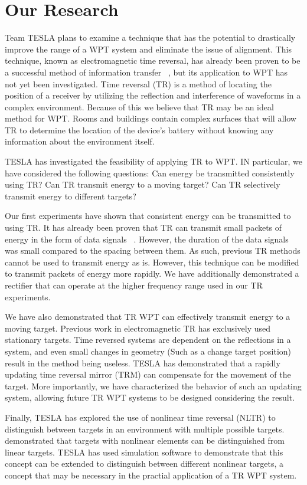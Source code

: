 \section{Our Research}
Team TESLA plans to examine a technique that has the potential to drastically improve the range of a WPT system and eliminate the issue of alignment. This technique, known as electromagnetic time reversal, has already been proven to be a successful method of information transfer ~\cite{nltr-wave-chaotic,cepni2005experimental}, but its application to WPT has not yet been investigated. Time reversal (TR) is a method of locating the position of a receiver by utilizing the reflection and interference of waveforms in a complex environment. Because of this we believe that TR may be an ideal method for WPT. Rooms and buildings contain complex surfaces that will allow TR to determine the location of the device's battery without knowing any information about the environment itself.

TESLA has investigated the feasibility of applying TR to WPT. IN particular, we have considered the following questions: Can energy be transmitted consistently using TR? Can TR transmit energy to a moving target? Can TR selectively transmit energy to different targets?

Our first experiments have shown that consistent energy  can be transmitted to using TR. It has already been proven that TR can transmit small packets of energy in the form of data signals ~\cite{nltr-wave-chaotic}. However, the duration of the data signals was small compared to the spacing between them. As such, previous TR methods cannot be used to transmit energy as is.  However, this technique can be modified to transmit packets of energy more rapidly.  We have additionally demonstrated a rectifier that can operate at the higher frequency range used in our TR experiments.

We have also demonstrated that TR WPT can effectively transmit energy to a moving target. Previous work in electromagnetic TR has exclusively used stationary targets. Time reversed systems are dependent on the reflections in a system, and even small changes in geometry (Such as a change target position) result in the method being useless.  TESLA has demonstrated that a rapidly updating time reversal mirror (TRM) can compensate for the movement of the target.  More importantly, we have characterized the behavior of such an updating system, allowing future TR WPT systems to be designed considering the result.

Finally, TESLA has explored the use of nonlinear time reversal (NLTR) to distinguish between targets in an environment with multiple possible targets. \cite{nltr-wave-chaotic} demonstrated that targets with nonlinear elements can be distinguished from linear targets.  TESLA has used simulation software to demonstrate that this concept can be extended to distinguish between different nonlinear targets, a concept that may be necessary in the practial application of a TR WPT system.
